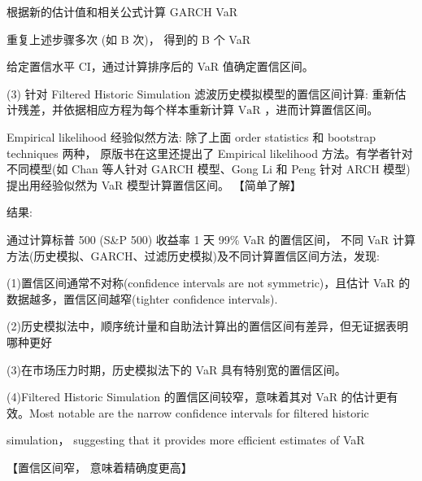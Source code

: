 根据新的估计值和相关公式计算 GARCH VaR

重复上述步骤多次 (如 B 次)， 得到的 B 个 VaR

给定置信水平 CI，通过计算排序后的 VaR 值确定置信区间。

(3) 针对 Filtered Historic Simulation 滤波历史模拟模型的置信区间计算: 重新估计残差，并依据相应方程为每个样本重新计算 \(\mathrm{{VaR}}\) ，进而计算置信区间。

 Empirical likelihood 经验似然方法: 除了上面 order statistics 和 bootstrap techniques 两种， 原版书在这里还提出了 Empirical likelihood 方法。有学者针对不同模型(如 Chan 等人针对 GARCH 模型、Gong Li 和 Peng 针对 ARCH 模型)提出用经验似然为 VaR 模型计算置信区间。 【简单了解】

结果:

通过计算标普 500 (S\&P 500) 收益率 1 天 99\% VaR 的置信区间， 不同 VaR 计算方法(历史模拟、GARCH、过滤历史模拟)及不同计算置信区间方法，发现:

(1)置信区间通常不对称(confidence intervals are not symmetric)，且估计 VaR 的数据越多，置信区间越窄(tighter confidence intervals).

(2)历史模拟法中，顺序统计量和自助法计算出的置信区间有差异，但无证据表明哪种更好

(3)在市场压力时期，历史模拟法下的 VaR 具有特别宽的置信区间。

(4)Filtered Historic Simulation 的置信区间较窄，意味着其对 VaR 的估计更有效。Most notable are the narrow confidence intervals for filtered historic

simulation， suggesting that it provides more efficient estimates of VaR

【置信区间窄， 意味着精确度更高】

